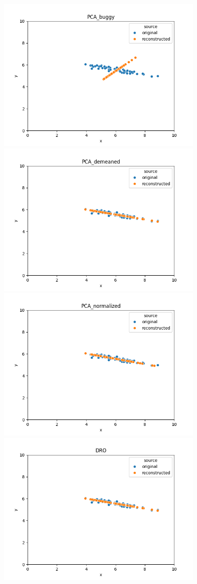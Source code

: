 \documentclass[a4paper]{article}
\theoremstyle{definition}
\begin{document}
\begin{itemize}
\begin{itemize}
\includegraphics[width=4in]{hw5/PCA_buggy.png} \\
\includegraphics[width=4in]{hw5/PCA_demeaned.png} \\
\includegraphics[width=4in]{hw5/PCA_normalized.png} \\
\includegraphics[width=4in]{hw5/DRO.png} \\


\end{itemize}
\end{itemize}
\end{document}
